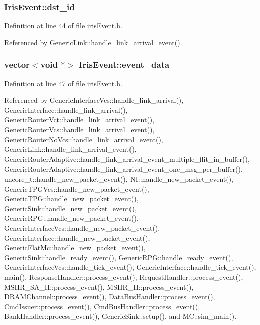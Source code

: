 \subsubsection[{dst\_\-id}]{ {\bf IrisEvent::dst\_\-id}}\label{classIrisEvent_274c046ce64d15b914c0b8cbdebfea31}




Definition at line 44 of file irisEvent.h.

Referenced by GenericLink::handle\_\-link\_\-arrival\_\-event().
\subsubsection[{event\_\-data}]{\setlength{\rightskip}{0pt plus 5cm}vector$<$void $\ast$$>$ {\bf IrisEvent::event\_\-data}}\label{classIrisEvent_26464fd0f931717a1e83b91111efc7b4}




Definition at line 47 of file irisEvent.h.

Referenced by GenericInterfaceVcs::handle\_\-link\_\-arrival(), GenericInterface::handle\_\-link\_\-arrival(), GenericRouterVct::handle\_\-link\_\-arrival\_\-event(), GenericRouterVcs::handle\_\-link\_\-arrival\_\-event(), GenericRouterNoVcs::handle\_\-link\_\-arrival\_\-event(), GenericLink::handle\_\-link\_\-arrival\_\-event(), GenericRouterAdaptive::handle\_\-link\_\-arrival\_\-event\_\-multiple\_\-flit\_\-in\_\-buffer(), GenericRouterAdaptive::handle\_\-link\_\-arrival\_\-event\_\-one\_\-msg\_\-per\_\-buffer(), uncore\_\-t::handle\_\-new\_\-packet\_\-event(), NI::handle\_\-new\_\-packet\_\-event(), GenericTPGVcs::handle\_\-new\_\-packet\_\-event(), GenericTPG::handle\_\-new\_\-packet\_\-event(), GenericSink::handle\_\-new\_\-packet\_\-event(), GenericRPG::handle\_\-new\_\-packet\_\-event(), GenericInterfaceVcs::handle\_\-new\_\-packet\_\-event(), GenericInterface::handle\_\-new\_\-packet\_\-event(), GenericFlatMc::handle\_\-new\_\-packet\_\-event(), GenericSink::handle\_\-ready\_\-event(), GenericRPG::handle\_\-ready\_\-event(), GenericInterfaceVcs::handle\_\-tick\_\-event(), GenericInterface::handle\_\-tick\_\-event(), main(), ResponseHandler::process\_\-event(), RequestHandler::process\_\-event(), MSHR\_\-SA\_\-H::process\_\-event(), MSHR\_\-H::process\_\-event(), DRAMChannel::process\_\-event(), DataBusHandler::process\_\-event(), CmdIssuer::process\_\-event(), CmdBusHandler::process\_\-event(), BankHandler::process\_\-event(), GenericSink::setup(), and MC::sim\_\-main().
